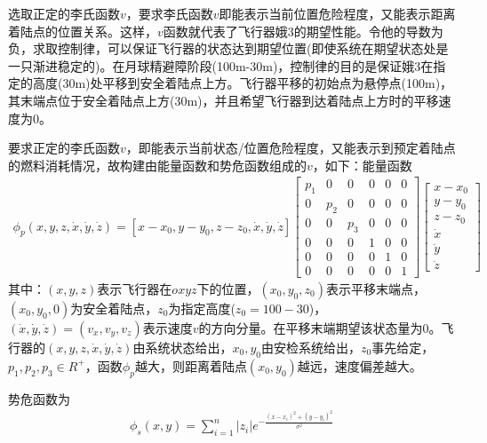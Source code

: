             \par
            选取正定的李氏函数$v$，要求李氏函数$v$即能表示当前位置危险程度，又能表示距离着陆点的位置关系。这样，$v$函数就代表了飞行器娥3的期望性能。令他的导数为负，求取控制律，可以保证飞行器的状态达到期望位置(即使系统在期望状态处是一只渐进稳定的)。在月球精避障阶段(100m-30m)，控制律的目的是保证娥3在指定的高度(30m)处平移到安全着陆点上方。飞行器平移的初始点为悬停点(100m)，其末端点位于安全着陆点上方(30m)，并且希望飞行器到达着陆点上方时的平移速度为0。
            \par
            要求正定的李氏函数$v$，即能表示当前状态/位置危险程度，又能表示到预定着陆点的燃料消耗情况，故构建由能量函数和势危函数组成的$v$，如下：能量函数
            \begin{align}
            \label{能量函数}
            \phi_p(x,y,z,\dot{x},\dot{y},\dot{z}) = [x-x_0,y-y_0,z-z_0,\dot{x},\dot{y},\dot{z}]
            \begin{bmatrix}
            p_1&0&0&0&0&0\\
            0&p_2&0&0&0&0\\
            0&0&p_3&0&0&0\\
            0&0&0&1&0&0\\
            0&0&0&0&1&0\\
            0&0&0&0&0&1
            \end{bmatrix}
            \begin{bmatrix}
            x-x_0\\
            y-y_0\\
            z-z_0\\
            \dot{x}\\
            \dot{y}\\
            \dot{z}
            \end{bmatrix}
            \end{align}
            其中：$(x,y,z)$表示飞行器在$oxyz$下的位置，$(x_0,y_0,z_0)$表示平移末端点，$(x_0,y_0,0)$为安全着陆点，$z_0$为指定高度($z_0 = 100 - 30$)，$(\dot{x},\dot{y},\dot{z}) = (v_x,v_y,v_z)$表示速度$v$的方向分量。在平移末端期望该状态量为0。飞行器的$(x,y,z,\dot{x},\dot{y},\dot{z})$由系统状态给出，$x_0,y_0$由安检系统给出，$z_0$事先给定，$p_1,p_2,p_3\in R^+$，函数$\phi_p$越大，则距离着陆点$(x_0,y_0)$越远，速度偏差越大。
            \par
            势危函数为
            \begin{align}
            \label{势危函数}
            \phi_s(x,y) = \sum_{i=1}^n|z_i| e^{ -\frac{(x-x_i)^2+(y-y_i)^2}{\sigma^2}  }
            \end{align}
